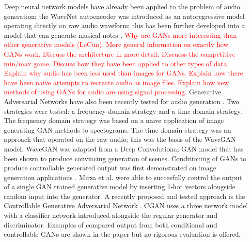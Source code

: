 \documentclass[a4paper, titlepage]{article}
\begin{document}
Deep neural network models have already been applied to the problem of audio generation: the WaveNet autoencoder \cite{DBLP:journals/corr/OordDZSVGKSK16} was introduced as an autoregressive model operating directly on raw audio waveform; this has been further developed into a model that can generate musical notes \cite{2017arXiv170401279E}.
\newline
\newline
\textcolor{red}{
  Why are GANs more interesting than other generative models (LeCun).
  More general information on exactly how GANs work.
  Discuss the architecture in more detail.
  Discuess the competitive min/max game.
  Discuss how they have been applied to other types of data.
}
\newline
\newline
\textcolor{red}{
  Explain why audio has been less used than images for GANs.
  Explain how there have been naive attempts to recreate audio as image files.
  Explain how new methods of using GANs for audio are using signal processing.
}
\newline
\newline
Generative Adversarial Networks have also been recently tested for audio generation \cite{2018arXiv180204208D}.
Two strategies were tested: a frequency domain strategy and a time domain strategy.
The frequency domain strategy was based on a naive application of image generating GAN methods to spectograms.
The time domain strategy was an approach that operated on the raw audio; this was the basis of the WaveGAN model.
WaveGAN was adapted from a Deep Convolutional GAN model \cite{2015arXiv151106434R} that has been shown to produce convincing generation of scenes.
\newline
\newline
Conditioning of GANs to produce controllable generated output was first demonstrated on image generation applications \cite{2014arXiv1411.1784M}.
Mirza et al. were able to succesfully control the output of a single GAN trained generative model by inserting 1-hot vectors alongside random input into the generator.
\newline
\newline
A recently proposed and tested approach is the Controllable Generative Adversarial Network \cite{2017arXiv170800598L}.
CGAN uses a three network model with a classifier network introduced alongside the regular generator and discriminator.
Examples of compared output from both conditional and controllable GANs are shown in the paper but no rigorous evaluation is offered.
\end{document}
